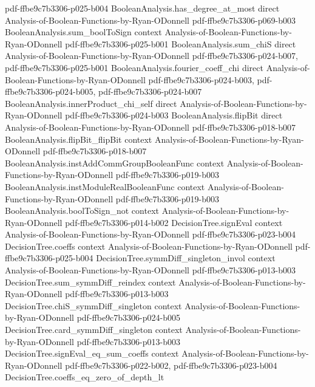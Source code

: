 \begin{theorem}
  {pdf-ffbe9c7b3306-p025-b004}
\proofstep
  {BooleanAnalysis.has_degree_at_most}
  {direct}
  {Analysis-of-Boolean-Functions-by-Ryan-ODonnell}
  {pdf-ffbe9c7b3306-p069-b003}
\proofstep
  {BooleanAnalysis.sum_boolToSign}
  {context}
  {Analysis-of-Boolean-Functions-by-Ryan-ODonnell}
  {pdf-ffbe9c7b3306-p025-b001}
\proofstep
  {BooleanAnalysis.sum_chiS}
  {direct}
  {Analysis-of-Boolean-Functions-by-Ryan-ODonnell}
  {pdf-ffbe9c7b3306-p024-b007,
    pdf-ffbe9c7b3306-p025-b001}
\proofstep
  {BooleanAnalysis.fourier_coeff_chi}
  {direct}
  {Analysis-of-Boolean-Functions-by-Ryan-ODonnell}
  {pdf-ffbe9c7b3306-p024-b003,
    pdf-ffbe9c7b3306-p024-b005,
    pdf-ffbe9c7b3306-p024-b007}
\proofstep
  {BooleanAnalysis.innerProduct_chi_self}
  {direct}
  {Analysis-of-Boolean-Functions-by-Ryan-ODonnell}
  {pdf-ffbe9c7b3306-p024-b003}
\proofstep
  {BooleanAnalysis.flipBit}
  {direct}
  {Analysis-of-Boolean-Functions-by-Ryan-ODonnell}
  {pdf-ffbe9c7b3306-p018-b007}
\proofstep
  {BooleanAnalysis.flipBit_flipBit}
  {context}
  {Analysis-of-Boolean-Functions-by-Ryan-ODonnell}
  {pdf-ffbe9c7b3306-p018-b007}
\proofstep
  {BooleanAnalysis.instAddCommGroupBooleanFunc}
  {context}
  {Analysis-of-Boolean-Functions-by-Ryan-ODonnell}
  {pdf-ffbe9c7b3306-p019-b003}
\proofstep
  {BooleanAnalysis.instModuleRealBooleanFunc}
  {context}
  {Analysis-of-Boolean-Functions-by-Ryan-ODonnell}
  {pdf-ffbe9c7b3306-p019-b003}
\proofstep
  {BooleanAnalysis.boolToSign_not}
  {context}
  {Analysis-of-Boolean-Functions-by-Ryan-ODonnell}
  {pdf-ffbe9c7b3306-p014-b002}
\proofstep
  {DecisionTree.signEval}
  {context}
  {Analysis-of-Boolean-Functions-by-Ryan-ODonnell}
  {pdf-ffbe9c7b3306-p023-b004}
\proofstep
  {DecisionTree.coeffs}
  {context}
  {Analysis-of-Boolean-Functions-by-Ryan-ODonnell}
  {pdf-ffbe9c7b3306-p025-b004}
\proofstep
  {DecisionTree.symmDiff_singleton_invol}
  {context}
  {Analysis-of-Boolean-Functions-by-Ryan-ODonnell}
  {pdf-ffbe9c7b3306-p013-b003}
\proofstep
  {DecisionTree.sum_symmDiff_reindex}
  {context}
  {Analysis-of-Boolean-Functions-by-Ryan-ODonnell}
  {pdf-ffbe9c7b3306-p013-b003}
\proofstep
  {DecisionTree.chiS_symmDiff_singleton}
  {context}
  {Analysis-of-Boolean-Functions-by-Ryan-ODonnell}
  {pdf-ffbe9c7b3306-p024-b005}
\proofstep
  {DecisionTree.card_symmDiff_singleton}
  {context}
  {Analysis-of-Boolean-Functions-by-Ryan-ODonnell}
  {pdf-ffbe9c7b3306-p013-b003}
\proofstep
  {DecisionTree.signEval_eq_sum_coeffs}
  {context}
  {Analysis-of-Boolean-Functions-by-Ryan-ODonnell}
  {pdf-ffbe9c7b3306-p022-b002,
    pdf-ffbe9c7b3306-p023-b004}
\proofstep
  {DecisionTree.coeffs_eq_zero_of_depth_lt}

\end{theorem}

